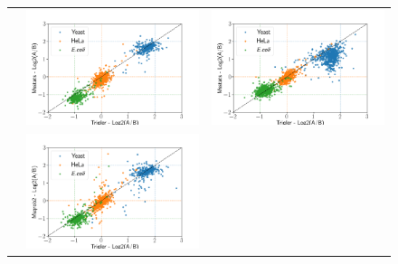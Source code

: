 \documentclass[11pt]{article}
\begin{document}
\begin{figure}[hbt]
\begin{tabular}{   >{\centering\arraybackslash} m{3cm} V V}
        {} & \includegraphics[width=\linewidth]{../../result/report_plots_pipeline/scatter_ID_triqler_vs_msstats.png}  
                & \includegraphics[width=\linewidth]{../../result/report_plots_pipeline/scatter_PS_triqler_vs_msstats.png} \\ 
        {} & \includegraphics[width=\linewidth]{../../result/report_plots_pipeline/scatter_ID_triqler_vs_msqrob2.png}  

\end{tabular}
\end{figure}
\end{document}
